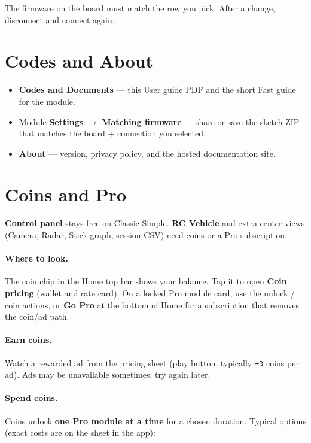 \documentclass[12pt,a4paper]{article}
\newcommand{\ui}[1]{\textsf{\textbf{#1}}}
\begin{document}
The firmware on the board must match the row you pick.
After a change, disconnect and connect again.

\section{Codes and About}
\label{sec:docs}

\begin{itemize}[leftmargin=1.4cm]
  \item \ui{Codes and Documents} --- this User guide PDF and the short Fast
        guide for the module.
  \item Module \ui{Settings} $\rightarrow$ \ui{Matching firmware} --- share or
        save the sketch ZIP that matches the board + connection you selected.
  \item \ui{About} --- version, privacy policy, and the hosted documentation
        site.
\end{itemize}

\section{Coins and Pro}
\label{sec:coins}

\ui{Control panel} stays free on Classic Simple.
\ui{RC Vehicle} and extra center views
(Camera, Radar, Stick graph, session CSV) need coins or a Pro subscription.

\paragraph{Where to look.}
The coin chip in the Home top bar shows your balance.
Tap it to open \ui{Coin pricing} (wallet and rate card).
On a locked Pro module card, use the unlock / coin actions, or
\ui{Go Pro} at the bottom of Home for a subscription that removes the
coin/ad path.

\paragraph{Earn coins.}
Watch a rewarded ad from the pricing sheet (play button, typically
\texttt{+3} coins per ad). Ads may be unavailable sometimes; try again
later.

\paragraph{Spend coins.}
Coins unlock \textbf{one Pro module at a time} for a chosen duration.
Typical options (exact costs are on the sheet in the app):
\end{document}
